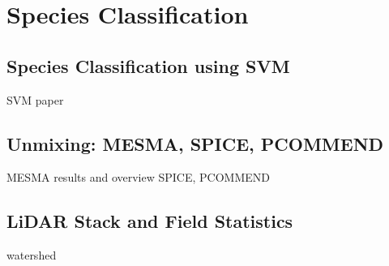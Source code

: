 \chapter{Species Classification}
\label{chapter:Species Classification}

\section{Species Classification using SVM}

SVM paper

\section{Unmixing: MESMA, SPICE, PCOMMEND}

MESMA results and overview SPICE, PCOMMEND

\section{LiDAR Stack and Field Statistics}

watershed
